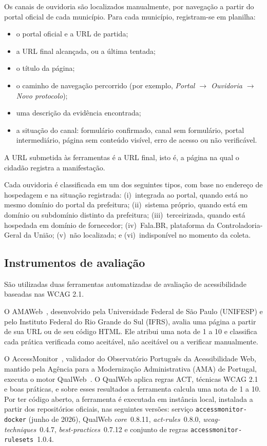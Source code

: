 \documentclass[12pt]{article}
\begin{document}
Os canais de ouvidoria são localizados manualmente, por navegação a partir do portal oficial de cada município. Para cada município, registram-se em planilha:
\begin{itemize}
  \item o portal oficial e a URL de partida;
  \item a URL final alcançada, ou a última tentada;
  \item o título da página;
  \item o caminho de navegação percorrido (por exemplo, \textit{Portal $\rightarrow$ Ouvidoria $\rightarrow$ Novo protocolo});
  \item uma descrição da evidência encontrada;
  \item a situação do canal: formulário confirmado, canal sem formulário, portal intermediário, página sem conteúdo visível, erro de acesso ou não verificável.
\end{itemize}
A URL submetida às ferramentas é a URL final, isto é, a página na qual o cidadão registra a manifestação.

Cada ouvidoria é classificada em um dos seguintes tipos, com base no endereço de hospedagem e na situação registrada:
(i)~integrada ao portal, quando está no mesmo domínio do portal da prefeitura;
(ii)~sistema próprio, quando está em domínio ou subdomínio distinto da prefeitura;
(iii)~terceirizada, quando está hospedada em domínio de fornecedor;
(iv)~Fala.BR, plataforma da Controladoria-Geral da União;
(v)~não localizada; e
(vi)~indisponível no momento da coleta.

\subsection{Instrumentos de avaliação}

São utilizadas duas ferramentas automatizadas de avaliação de acessibilidade baseadas nas WCAG 2.1.

O AMAWeb~\cite{amaweb}, desenvolvido pela Universidade Federal de São Paulo (UNIFESP) e pelo Instituto Federal do Rio Grande do Sul (IFRS), avalia uma página a partir de sua URL ou de seu código HTML. Ele atribui uma nota de 1 a 10 e classifica cada prática verificada como aceitável, não aceitável ou a verificar manualmente.

O AccessMonitor~\cite{accessmonitor}, validador do Observatório Português da Acessibilidade Web, mantido pela Agência para a Modernização Administrativa (AMA) de Portugal, executa o motor QualWeb~\cite{qualweb}. O QualWeb aplica regras ACT, técnicas WCAG 2.1 e boas práticas, e sobre esses resultados a ferramenta calcula uma nota de 1 a 10. Por ter código aberto, a ferramenta é executada em instância local, instalada a partir dos repositórios oficiais, nas seguintes versões: serviço \texttt{accessmonitor-docker} (junho de 2026), QualWeb \textit{core}~0.8.11, \textit{act-rules}~0.8.0, \textit{wcag-techniques}~0.4.7, \textit{best-practices}~0.7.12 e conjunto de regras \texttt{accessmonitor-rulesets}~1.0.4.
\end{document}
